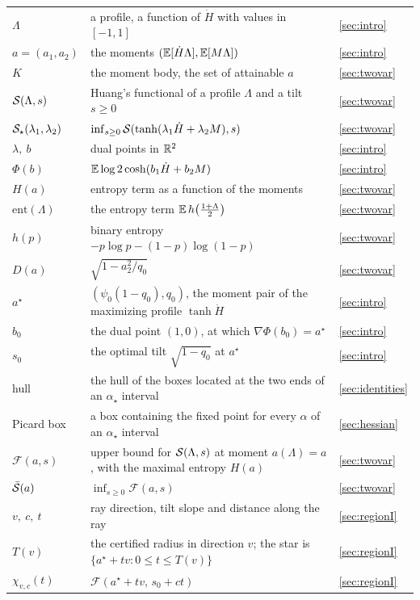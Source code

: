 \begin{longtable}{p{}p{}p{}}
$\Lambda$ & a profile, a function of $\dot H$ with values in $[-1,1]$ & \ref{sec:intro}\\
$a=(a_1,a_2)$ & the moments $(\mathbb{E}[\dot H\Lambda],\mathbb{E}[M\Lambda])$ & \ref{sec:intro}\\
$K$ & the moment body, the set of attainable $a$ & \ref{sec:twovar}\\
$\mathcal{S}(\Lambda,s)$ & Huang's functional of a profile $\Lambda$ and a tilt $s\ge0$ & \ref{sec:twovar}\\
$\mathcal{S}_\star(\lambda_1,\lambda_2)$ & $\inf_{s\ge0}\mathcal{S}(\tanh(\lambda_1\dot H+\lambda_2M),s)$ & \ref{sec:twovar}\\
$\lambda,\ b$ & dual points in $\mathbb{R}^2$ & \ref{sec:intro}\\
$\Phi(b)$ & $\mathbb{E}\log2\cosh(b_1\dot H+b_2M)$ & \ref{sec:intro}\\
$H(a)$ & entropy term as a function of the moments & \ref{sec:twovar}\\
$\mathrm{ent}(\Lambda)$ & the entropy term $\mathbb{E}\,h\bigl(\frac{1+\Lambda}2\bigr)$ & \ref{sec:twovar}\\
$h(p)$ & binary entropy $-p\log p-(1-p)\log(1-p)$ & \ref{sec:twovar}\\
$D(a)$ & $\sqrt{1-a_2^2/q_0}$ & \ref{sec:twovar}\\
$a^\star$ & $(\psi_0(1-q_0),q_0)$, the moment pair of the maximizing profile $\tanh\dot H$ & \ref{sec:intro}\\
$b_0$ & the dual point $(1,0)$, at which $\nabla\Phi(b_0)=a^\star$ & \ref{sec:intro}\\
$s_0$ & the optimal tilt $\sqrt{1-q_0}$ at $a^\star$ & \ref{sec:intro}\\
hull & the hull of the boxes located at the two ends of an $\alpha_\star$ interval & \ref{sec:identities}\\
Picard box & a box containing the fixed point for every $\alpha$ of an $\alpha_\star$ interval & \ref{sec:hessian}\\
$\mathcal F(a,s)$ & upper bound for $\mathcal{S}(\Lambda,s)$ at moment $a(\Lambda)=a$, with the maximal entropy $H(a)$ & \ref{sec:twovar}\\
$\bar{\mathcal{S}}(a)$ & $\inf_{s\ge0}\mathcal F(a,s)$ & \ref{sec:twovar}\\
$v,\ c,\ t$ & ray direction, tilt slope and distance along the ray & \ref{sec:regionI}\\
$T(v)$ & the certified radius in direction $v$; the star is $\{a^\star+tv:0\le t\le T(v)\}$ & \ref{sec:regionI}\\
$\chi_{v,c}(t)$ & $\mathcal F(a^\star+tv,\,s_0+ct)$ & \ref{sec:regionI}\\

\end{longtable}
